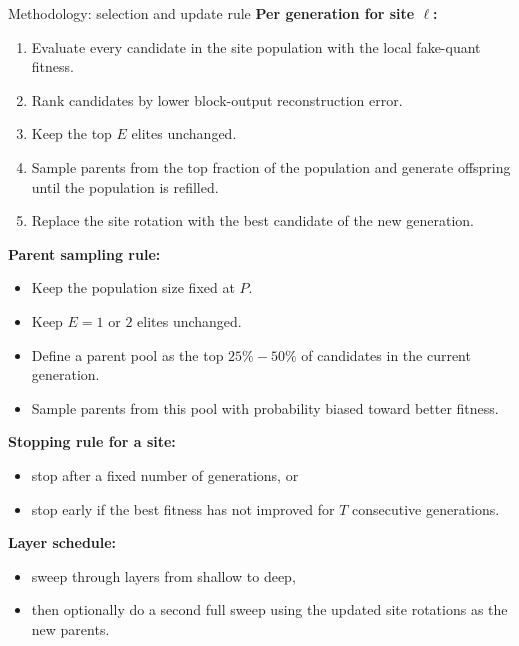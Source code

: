 \documentclass[aspectratio=169,11pt]{beamer}
\begin{document}
\begin{frame}{Methodology: selection and update rule}
\textbf{Per generation for site $\ell$:}
\begin{enumerate}
  \item Evaluate every candidate in the site population with the local fake-quant fitness.
  \item Rank candidates by lower block-output reconstruction error.
  \item Keep the top $E$ elites unchanged.
  \item Sample parents from the top fraction of the population and generate offspring until the population is refilled.
  \item Replace the site rotation with the best candidate of the new generation.
\end{enumerate}

\vspace{0.2cm}
\textbf{Parent sampling rule:}
\begin{itemize}
  \item Keep the population size fixed at $P$.
  \item Keep $E=1$ or $2$ elites unchanged.
  \item Define a parent pool as the top $25\%-50\%$ of candidates in the current generation.
  \item Sample parents from this pool with probability biased toward better fitness.
\end{itemize}

\vspace{0.2cm}
\textbf{Stopping rule for a site:}
\begin{itemize}
  \item stop after a fixed number of generations, or
  \item stop early if the best fitness has not improved for $T$ consecutive generations.
\end{itemize}

\vspace{0.2cm}
\textbf{Layer schedule:}
\begin{itemize}
  \item sweep through layers from shallow to deep,
  \item then optionally do a second full sweep using the updated site rotations as the new parents.
\end{itemize}
\end{frame}
\end{document}
